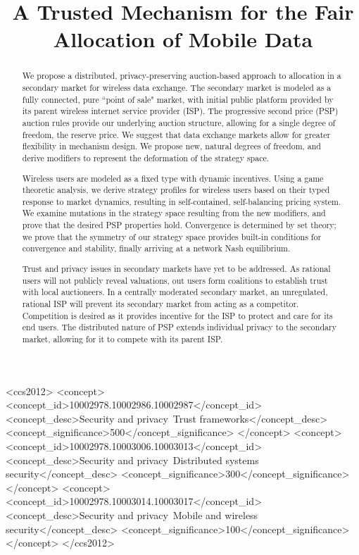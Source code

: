 \documentclass[sigconf, anonymous]{acmart}
\theoremstyle{definition}
\begin{document}
\title{A Trusted Mechanism for the Fair Allocation of Mobile Data} 

\begin{abstract}

We propose a distributed, privacy-preserving auction-based approach to
allocation in a secondary market for wireless data exchange.
The secondary market is modeled as a fully connected, pure ``point of sale"
market, with initial public platform provided by its parent wireless internet service
provider (ISP). 
The progressive second price (PSP) auction rules provide our underlying auction
structure, allowing for a single degree of freedom, the reserve
price. We suggest that data exchange markets allow for greater flexibility in
mechanism design.
We propose new, natural degrees of freedom, and derive modifiers
to represent the deformation of the strategy space. 

Wireless users are modeled as a fixed type with dynamic incentives. Using a game
theoretic analysis, we derive strategy profiles for wireless users
based on their typed response to market dynamics, resulting in self-contained, self-balancing pricing system. 
We examine mutations in the strategy space resulting from the new modifiers, and
prove that the desired PSP properties hold. 
Convergence is determined by set theory; we prove that the symmetry of our
strategy space provides built-in conditions for convergence and stability, finally arriving at a network Nash equilibrium.

Trust and privacy issues in secondary markets have yet to be addressed.
As rational users will not publicly reveal valuations, out users form coalitions to establish trust with local auctioneers.
In a centrally moderated secondary market, an unregulated,
rational ISP will prevent its secondary market from acting as a competitor.
Competition is desired as it provides incentive for the ISP to protect
and care for its end users.
The distributed nature of PSP extends individual privacy to the secondary market,
allowing for it to compete with its parent ISP. 
\end{abstract}

\begin{CCSXML}
<ccs2012>
<concept>
<concept_id>10002978.10002986.10002987</concept_id>
<concept_desc>Security and privacy~Trust frameworks</concept_desc>
<concept_significance>500</concept_significance>
</concept>
<concept>
<concept_id>10002978.10003006.10003013</concept_id>
<concept_desc>Security and privacy~Distributed systems security</concept_desc>
<concept_significance>300</concept_significance>
</concept>
<concept>
<concept_id>10002978.10003014.10003017</concept_id>
<concept_desc>Security and privacy~Mobile and wireless security</concept_desc>
<concept_significance>100</concept_significance>
</concept>
</ccs2012>
\end{CCSXML}
\end{document}
